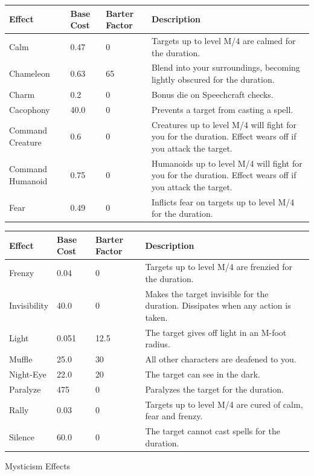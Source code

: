 \documentclass[12pt]{book}
\begin{document}
\begin{tabular}{p{}|p{}|p{}|p{}}
Effect & Base Cost & Barter Factor & Description\\ \hline
Calm & 0.47 & 0 & Targets up to level M/4 are calmed for the duration.\\ \hline
Chameleon & 0.63 & 65 & Blend into your surroundings, becoming lightly obscured for the duration.\\ \hline
Charm & 0.2 & 0 & Bonus die on Speechcraft checks.\\ \hline
Cacophony & 40.0 & 0 & Prevents a target from casting a spell.\\ \hline
Command Creature & 0.6 & 0 & Creatures up to level M/4 will fight for you for the duration. Effect wears off if you attack the target.\\ \hline
Command Humanoid & 0.75 & 0 & Humanoids up to level M/4 will fight for you for the duration. Effect wears off if you attack the target.\\ \hline
Fear & 0.49 & 0 & Inflicts fear on targets up to level M/4 for the duration.\\
\end{tabular}

\begin{tabular}{p{}|p{}|p{}|p{}}
Effect & Base Cost & Barter Factor & Description\\ \hline
Frenzy & 0.04 & 0 & Targets up to level M/4 are frenzied for the duration.\\ \hline
Invisibility & 40.0 & 0 & Makes the target invisible for the duration. Dissipates when any action is taken.\\ \hline
Light & 0.051 & 12.5 & The target gives off light in an M-foot radius.\\ \hline
Muffle & 25.0 & 30 & All other characters are deafened to you.\\ \hline
Night-Eye & 22.0 & 20 & The target can see in the dark.\\ \hline
Paralyze & 475 & 0 & Paralyzes the target for the duration.\\ \hline
Rally & 0.03 & 0 & Targets up to level M/4 are cured of calm, fear and frenzy.\\ \hline
Silence & 60.0 & 0 & The target cannot cast spells for the duration.\\
\end{tabular}

Mysticism Effects
\end{document}
